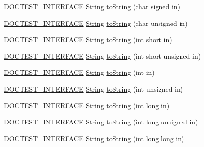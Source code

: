 \begin{DoxyCompactItemize}
\item 
\hyperlink{doctest_8h_a9c16ffc635ec47f07797d21ede26b1a5}{D\+O\+C\+T\+E\+S\+T\+\_\+\+I\+N\+T\+E\+R\+F\+A\+CE} \hyperlink{classdoctest_1_1String}{String} \hyperlink{namespacedoctest_a1f910fdc13d84a538090b959a97a6fa5}{to\+String} (char signed in)
\item 
\hyperlink{doctest_8h_a9c16ffc635ec47f07797d21ede26b1a5}{D\+O\+C\+T\+E\+S\+T\+\_\+\+I\+N\+T\+E\+R\+F\+A\+CE} \hyperlink{classdoctest_1_1String}{String} \hyperlink{namespacedoctest_ae2c3e60e3ee32da5d8fc4f778b7a225a}{to\+String} (char unsigned in)
\item 
\hyperlink{doctest_8h_a9c16ffc635ec47f07797d21ede26b1a5}{D\+O\+C\+T\+E\+S\+T\+\_\+\+I\+N\+T\+E\+R\+F\+A\+CE} \hyperlink{classdoctest_1_1String}{String} \hyperlink{namespacedoctest_aaff61384b81d700818094342c6110d2c}{to\+String} (int short in)
\item 
\hyperlink{doctest_8h_a9c16ffc635ec47f07797d21ede26b1a5}{D\+O\+C\+T\+E\+S\+T\+\_\+\+I\+N\+T\+E\+R\+F\+A\+CE} \hyperlink{classdoctest_1_1String}{String} \hyperlink{namespacedoctest_a04b10595f3fac969e7682a48fd3ad0c6}{to\+String} (int short unsigned in)
\item 
\hyperlink{doctest_8h_a9c16ffc635ec47f07797d21ede26b1a5}{D\+O\+C\+T\+E\+S\+T\+\_\+\+I\+N\+T\+E\+R\+F\+A\+CE} \hyperlink{classdoctest_1_1String}{String} \hyperlink{namespacedoctest_a0318ba5a1fbeb9e2fe84227a2f007dac}{to\+String} (int in)
\item 
\hyperlink{doctest_8h_a9c16ffc635ec47f07797d21ede26b1a5}{D\+O\+C\+T\+E\+S\+T\+\_\+\+I\+N\+T\+E\+R\+F\+A\+CE} \hyperlink{classdoctest_1_1String}{String} \hyperlink{namespacedoctest_a6de63ae787cb530ee050b3632106907d}{to\+String} (int unsigned in)
\item 
\hyperlink{doctest_8h_a9c16ffc635ec47f07797d21ede26b1a5}{D\+O\+C\+T\+E\+S\+T\+\_\+\+I\+N\+T\+E\+R\+F\+A\+CE} \hyperlink{classdoctest_1_1String}{String} \hyperlink{namespacedoctest_aac941ce13f416e31d72d9fb114681bb2}{to\+String} (int long in)
\item 
\hyperlink{doctest_8h_a9c16ffc635ec47f07797d21ede26b1a5}{D\+O\+C\+T\+E\+S\+T\+\_\+\+I\+N\+T\+E\+R\+F\+A\+CE} \hyperlink{classdoctest_1_1String}{String} \hyperlink{namespacedoctest_ac1c9dfb0453eb7d222bed9d2a4cf62fd}{to\+String} (int long unsigned in)
\item 
\hyperlink{doctest_8h_a9c16ffc635ec47f07797d21ede26b1a5}{D\+O\+C\+T\+E\+S\+T\+\_\+\+I\+N\+T\+E\+R\+F\+A\+CE} \hyperlink{classdoctest_1_1String}{String} \hyperlink{namespacedoctest_ada057336406349bd947f26b1ddb97bd0}{to\+String} (int long long in)

\end{DoxyCompactItemize}
